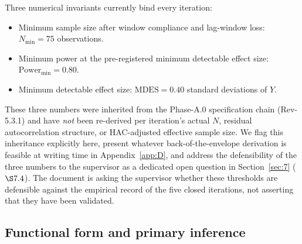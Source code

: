 Three numerical invariants currently bind every iteration:

\begin{itemize}
  \item Minimum sample size after window compliance and lag-window loss:
    \(N_{\min} = 75\) observations.
  \item Minimum power at the pre-registered minimum detectable effect size:
    \(\mathrm{Power}_{\min} = 0.80\).
  \item Minimum detectable effect size: \(\mathrm{MDES} = 0.40\) standard
    deviations of \(Y\).
\end{itemize}

These three numbers were inherited from the Phase-A.0 specification chain
(Rev-5.3.1) and have \emph{not} been re-derived per iteration's actual
\(N\), residual autocorrelation structure, or HAC-adjusted effective sample
size. We flag this inheritance explicitly here, present whatever
back-of-the-envelope derivation is feasible at writing time in
Appendix~\ref{app:D}, and address the defensibility of the three numbers
to the supervisor as a dedicated open question in Section~\ref{sec:7}
(\(\S 7.4\)). The document is asking the supervisor whether these
thresholds are defensible against the empirical record of the
five closed iterations, not asserting that they have been validated.

\subsection{Functional form and primary inference}\label{sec:5.3}

